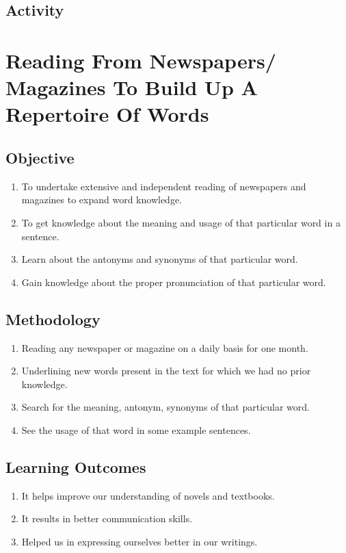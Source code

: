 \subsection{Activity}
\pagebreak

\section{Reading From Newspapers/ Magazines To Build Up A Repertoire Of Words}
\label{Reading From Newspapers/ Magazines To}
\subsection{Objective}
\begin{enumerate}
      \item To undertake extensive and independent reading of newspapers and magazines to
            expand word knowledge.
      \item To get knowledge about the meaning and usage of that particular word in a sentence.
      \item Learn about the antonyms and synonyms of that particular word.
      \item Gain knowledge about the proper pronunciation of that particular word.
\end{enumerate}

\subsection{Methodology}
\begin{enumerate}
      \item Reading any newspaper or magazine on a daily basis for one month.
      \item Underlining new words present in the text for which we had no prior knowledge.
      \item Search for the meaning, antonym, synonyms of that particular word.
      \item See the usage of that word in some example sentences.
\end{enumerate}

\subsection{Learning Outcomes}
\begin{enumerate}
      \item It helps improve our understanding of novels and textbooks.
      \item It results in better communication skills.
      \item Helped us in expressing ourselves better in our writings.
\end{enumerate}

